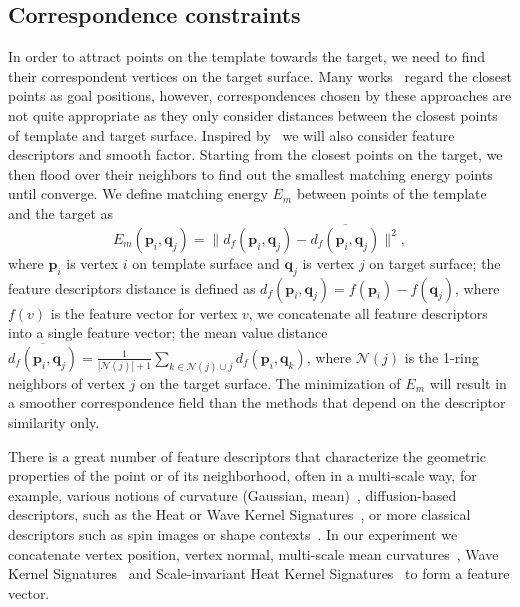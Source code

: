\subsection{Correspondence  constraints}
In order to attract points on the template towards the target, we need to find their correspondent vertices on the target surface. Many works~\citep{yamazaki2013non,yoshiyasu2014conformal,gilles2010creating} regard the closest points as goal positions, however, correspondences chosen by these approaches are not quite appropriate as they only consider distances between the closest points of template and target surface. Inspired by~\citep{qixing2008non,papazov2011deformable} we will also consider feature descriptors and smooth factor. Starting from the closest points on the target, we then flood over their neighbors to find out the smallest matching energy points until converge. We define matching energy $E_m$ between points of the template and the target as
\begin{equation}
E_m(\mathbf p_i, \mathbf q_j) =\|d_f(\mathbf p_i, \mathbf q_j)-\overline{d_f(\mathbf p_i, \mathbf q_j)}\|^2,
\end{equation}
where $\mathbf p_i$ is vertex $i$ on template surface and $\mathbf q_j$ is vertex $j$ on target surface; the feature descriptors distance is defined as $d_f(\mathbf p_i, \mathbf q_j)=f(\mathbf p_i)-f(\mathbf q_j)$, where $f(v)$ is the feature vector for vertex $v$, we concatenate all feature descriptors into a single feature vector; the mean value distance $\overline{d_f(\mathbf p_i, \mathbf q_j)} = \frac{1}{|\mathcal{N}(j)|+1}\sum_{k \in \mathcal{N}(j)\cup j}d_f(\mathbf p_i, \mathbf q_k)$, where $\mathcal{N}(j)$ is the 1-ring neighbors of vertex $j$ on the target surface. The minimization of $E_m$ will result in a smoother correspondence field than the methods that depend on the descriptor similarity only.

There is a great number of feature descriptors that characterize the geometric properties of the point or of its neighborhood, often in a multi-scale way, for example, various notions of curvature (Gaussian, mean)~\cite{meyer2003discrete}, diffusion-based descriptors, such as the Heat or Wave Kernel Signatures~\cite{sun2009concise,aubry2011wave}, or more classical descriptors such as spin images or shape contexts~\cite{johnson1999using,belongie2002shape}. In our experiment we concatenate vertex position, vertex normal, multi-scale mean curvatures~\cite{panozzo2010efficient}, Wave Kernel Signatures~\cite{aubry2011wave} and Scale-invariant Heat Kernel Signatures~\cite{bronstein2010scale} to form a feature vector.\\

